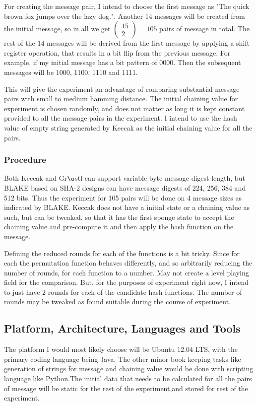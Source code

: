 \documentclass[12pt]{artikel3}                  %
\begin{document}
  For creating the message pair, I intend to choose the first message as "The quick brown fox jumps over the lazy dog.".
  Another 14 messages will be created from the initial message, so in all we get $\begin{pmatrix} 15 \\ 2 \end{pmatrix}
  = 105$ pairs of message in total. The rest of the 14 messages will be derived from the first message by applying a
  shift register operation, that results in a bit flip from the previous message. For example, if my initial message has
  a bit pattern of 0000. Then the subsequent messages will be 1000, 1100, 1110 and 1111.
  
  This will give the experiment an advantage of comparing substantial message pairs with small to medium hamming distance.
  The initial chaining value for experiment is chosen randomly, and does not matter as long it is kept constant provided
  to all the message pairs in the experiment. I intend to use the hash value of empty string generated by Keccak as the 
  initial chaining value for all the pairs.

  \subsubsection{Procedure}

  Both Keccak and Gr$\o$stl can support variable byte message digest length, but BLAKE based on SHA-2 designs can have
  message digests of 224, 256, 384 and 512 bits. Thus the experiment for 105 pairs will be done on 4 message sizes as
  indicated by BLAKE. Keccak does not have a initial state or a chaining value as such, but can be tweaked, so that it
  has the first sponge state to accept the chaining value and pre-compute it and then apply the hash function on the
  message.

  Defining the reduced rounds for each of the functions is a bit tricky. Since for each the permutation function behaves
  differently, and so arbitrarily reducing the number of rounds, for each function to a number. May not create a level
  playing field for the comparison. But, for the purposes of experiment right now, I intend to just have 2 rounds for 
  each of the candidate hash functions. The number of rounds may be tweaked as found suitable during the course of 
  experiment.

\subsection{Platform, Architecture, Languages and Tools}
The platform I would most likely choose will be Ubuntu 12.04 LTS, with the primary coding language
being Java. The other minor book keeping tasks like generation of strings for message and chaining
value would be done with scripting language like Python.The initial data that needs to be calculated 
for all the pairs of message will be static for the rest of the experiment,and stored for rest of the
experiment.
\end{document}
